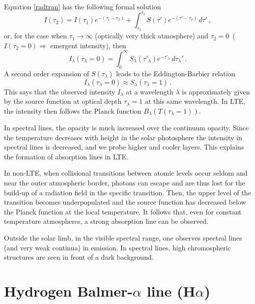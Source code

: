 Equation \ref{radtran} has the following formal solution
\begin{equation}
I(\tau_{2})=I(\tau_{1})e^{-(\tau_{1}-\tau_{2})}+ \int_{\tau_{2}}^{\tau_{1}}S(\tau')e^{-(\tau'-\tau_{2})}\,d\tau' \, ,
\end{equation}
or, for the case when $\tau_{1} \rightarrow \infty$ (optically very thick atmosphere) and $\tau_{2}=0$ \,($I(\tau_{2}=0)  \Rightarrow$ emergent intensity), then 
\begin{equation}
I_{\lambda}(\tau_{\lambda}=0)=\int_{0}^{\infty}S_{\lambda}(\tau'_{\lambda})e^{-\tau'_{\lambda}}\,d\tau_{\lambda}' \, .
\end{equation}
A second order expansion of $S(\tau_{\lambda})$ leads to the Eddington-Barbier relation
\begin{equation}
I_{\lambda}(\tau_{\lambda}=0) \approx S_{\lambda}(\tau_{\lambda}=1)\,.
\end{equation}
 This says that the observed intensity $I_{\lambda}$ at a wavelength $\lambda$ is approximately given by the source function at optical depth $\tau_{\lambda}=1$ at this same wavelength. In LTE, the intensity then follows the Planck function $B_{\lambda}(T(\tau_{\lambda}=1))$.
 
 In spectral lines, the opacity is much increased over the continuum opacity. Since the temperature decreases with height in the solar photosphere the intensity in spectral lines is decreased, and we probe higher and cooler layers. This explains the formation of absorption lines in LTE.
 
 In non-LTE, when collisional transitions between atomic levels occur seldom and near the outer atmospheric border, photons can escape and are thus lost for the build-up of a radiation field in the specific transition. Then, the upper level of the transition becomes underpopulated and the source function has decreased below the Planck function at the local temperature. It follows that, even for constant temperature atmospheres, a strong absorption line can be observed.
 
Outside the solar limb, in the visible spectral range, one observes spectral lines (and very weak continua) in emission. In spectral lines, high chromospheric structures are seen in front of a dark background.
 
\section{Hydrogen Balmer-$\alpha$ line (H$\alpha$)}

